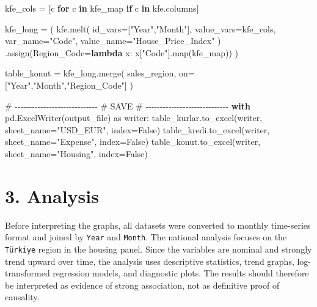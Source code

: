 \documentclass[
  11pt,
  a4paper,
  DIV=11,
  numbers=noendperiod]{scrartcl}
\newenvironment{Shaded}{\begin{snugshade}}{\end{snugshade}}
\newcommand{\BuiltInTok}[1]{\textcolor[rgb]{0.00,0.23,0.31}{#1}}
\newcommand{\CommentTok}[1]{\textcolor[rgb]{0.37,0.37,0.37}{#1}}
\newcommand{\ControlFlowTok}[1]{\textcolor[rgb]{0.00,0.23,0.31}{\textbf{#1}}}
\newcommand{\ImportTok}[1]{\textcolor[rgb]{0.00,0.46,0.62}{#1}}
\newcommand{\KeywordTok}[1]{\textcolor[rgb]{0.00,0.23,0.31}{\textbf{#1}}}
\newcommand{\NormalTok}[1]{\textcolor[rgb]{0.00,0.23,0.31}{#1}}
\newcommand{\OperatorTok}[1]{\textcolor[rgb]{0.37,0.37,0.37}{#1}}
\newcommand{\StringTok}[1]{\textcolor[rgb]{0.13,0.47,0.30}{#1}}
\newcommand{\VariableTok}[1]{\textcolor[rgb]{0.07,0.07,0.07}{#1}}
\begin{document}
\begin{Shaded}
\begin{Highlighting}[]
\NormalTok{kfe\_cols }\OperatorTok{=}\NormalTok{ [c }\ControlFlowTok{for}\NormalTok{ c }\KeywordTok{in}\NormalTok{ kfe\_map }\ControlFlowTok{if}\NormalTok{ c }\KeywordTok{in}\NormalTok{ kfe.columns]}

\NormalTok{kfe\_long }\OperatorTok{=}\NormalTok{ (}
\NormalTok{    kfe.melt(}
\NormalTok{        id\_vars}\OperatorTok{=}\NormalTok{[}\StringTok{"Year"}\NormalTok{,}\StringTok{"Month"}\NormalTok{],}
\NormalTok{        value\_vars}\OperatorTok{=}\NormalTok{kfe\_cols,}
\NormalTok{        var\_name}\OperatorTok{=}\StringTok{"Code"}\NormalTok{,}
\NormalTok{        value\_name}\OperatorTok{=}\StringTok{"House\_Price\_Index"}
\NormalTok{    )}
\NormalTok{    .assign(Region\_Code}\OperatorTok{=}\KeywordTok{lambda}\NormalTok{ x: x[}\StringTok{"Code"}\NormalTok{].}\BuiltInTok{map}\NormalTok{(kfe\_map))}
\NormalTok{)}

\NormalTok{table\_konut }\OperatorTok{=}\NormalTok{ kfe\_long.merge(}
\NormalTok{    sales\_region,}
\NormalTok{    on}\OperatorTok{=}\NormalTok{[}\StringTok{"Year"}\NormalTok{,}\StringTok{"Month"}\NormalTok{,}\StringTok{"Region\_Code"}\NormalTok{]}
\NormalTok{)}

\CommentTok{\# {-}{-}{-}{-}{-}{-}{-}{-}{-}{-}{-}{-}{-}{-}{-}{-}{-}{-}{-}{-}{-}{-}{-}{-}{-}{-}{-}{-}{-}}
\CommentTok{\# SAVE}
\CommentTok{\# {-}{-}{-}{-}{-}{-}{-}{-}{-}{-}{-}{-}{-}{-}{-}{-}{-}{-}{-}{-}{-}{-}{-}{-}{-}{-}{-}{-}{-}}
\ControlFlowTok{with}\NormalTok{ pd.ExcelWriter(output\_file) }\ImportTok{as}\NormalTok{ writer:}
\NormalTok{    table\_kurlar.to\_excel(writer, sheet\_name}\OperatorTok{=}\StringTok{"USD\_EUR"}\NormalTok{, index}\OperatorTok{=}\VariableTok{False}\NormalTok{)}
\NormalTok{    table\_kredi.to\_excel(writer, sheet\_name}\OperatorTok{=}\StringTok{"Expense"}\NormalTok{, index}\OperatorTok{=}\VariableTok{False}\NormalTok{)}
\NormalTok{    table\_konut.to\_excel(writer, sheet\_name}\OperatorTok{=}\StringTok{"Housing"}\NormalTok{, index}\OperatorTok{=}\VariableTok{False}\NormalTok{)}
\end{Highlighting}
\end{Shaded}

\section{3. Analysis}\label{analysis}

Before interpreting the graphs, all datasets were converted to monthly
time-series format and joined by \texttt{Year} and \texttt{Month}. The
national analysis focuses on the \texttt{Türkiye} region in the housing
panel. Since the variables are nominal and strongly trend upward over
time, the analysis uses descriptive statistics, trend graphs,
log-transformed regression models, and diagnostic plots. The results
should therefore be interpreted as evidence of strong association, not
as definitive proof of causality.
\end{document}
